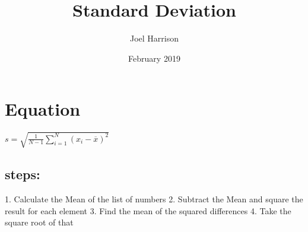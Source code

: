 \documentclass{article}
\title{Standard Deviation}
\author{Joel Harrison}
\date{February 2019}
\begin{document}
\maketitle

\section{Equation}
$s = \sqrt{\frac{1}{N-1} \sum_{i=1}^N (x_i - \overline{x})^2}$
\subsection{steps:}
			1. Calculate the Mean of the list of numbers
            2. Subtract the Mean and square the result for each element
            3. Find the mean of the squared differences
            4. Take the square root of that
\end{document}
